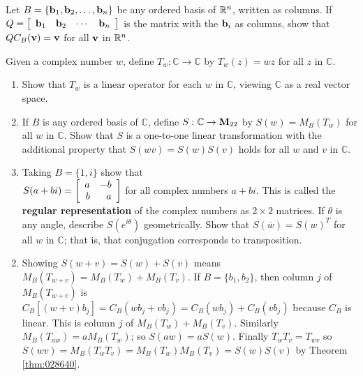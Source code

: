 \begin{multicols}{2}
\begin{ex}
Let $B = \{\textbf{b}_{1}, \textbf{b}_{2}, \dots, \textbf{b}_{n}\}$ be any ordered basis of $\mathbb{R}^n$, written as columns. If $Q = \left[ \begin{array}{cccc} \textbf{b}_{1} & \textbf{b}_{2} & \cdots & \textbf{b}_{n} \end{array} \right]$ is the matrix with the $\textbf{b}_{i}$ as columns, show that $QC_{B}(\textbf{v}) = \textbf{v}$ for all $\textbf{v}$ in $\mathbb{R}^n$.
\end{ex}

\columnbreak
\begin{ex}
Given a complex number $w$, define $T_{w} : \mathbb{C} \to \mathbb{C}$  by $T_{w}(z) = wz$ for all $z$ in $\mathbb{C}$.


\begin{enumerate}[label={\alph*.}]
\item Show that $T_{w}$ is a linear operator for each $w$ in $\mathbb{C}$, viewing $\mathbb{C}$ as a real vector space.

\item If $B$ is any ordered basis of $\mathbb{C}$, define $S : \mathbb{C}  \to \textbf{M}_{22}$ by $S(w) = M_{B}(T_{w})$ for all $w$ in $\mathbb{C}$. Show that $S$ is a one-to-one linear transformation with the additional property that $S(wv) = S(w)S(v)$ holds for all $w$ and $v$ in $\mathbb{C}$.

\item Taking $B = \{1, i\}$ show that \\ $S(a + bi) = \left[ \begin{array}{rr} a & -b \\ b & a \end{array} \right]$ for all complex numbers $a + bi$. This is called the \textbf{regular representation} of the complex numbers as $2 \times 2$ matrices. If $\theta$ is any angle, describe $S(e^{i\theta})$ geometrically. Show that $S(\overline{w}) = S(w)^T$ for all $w$ in $\mathbb{C}$; that is, that conjugation corresponds to transposition.

\end{enumerate}
\begin{sol}
\begin{enumerate}[label={\alph*.}]
\setcounter{enumi}{1}
\item Showing $S(w + v) = S(w) + S(v)$ means $M_{B}(T_{w+v}) = M_{B}(T_{w}) + M_{B}(T_{v})$. If $B = \{b_{1}, b_{2}\}$, then column $j$ of $M_{B}(T_{w+v})$ is $C_{B}[(w + v)b_{j}] = C_{B}(wb_{j} + vb_{j}) = C_{B}(wb_{j}) + C_{B}(vb_{j})$ because $C_{B}$ is linear. This is column $j$ of $M_{B}(T_{w}) + M_{B}(T_{v})$. Similarly $M_{B}(T_{aw}) = aM_{B}(T_{w})$; so $S(aw) = aS(w)$. Finally $T_{w}T_{v} = T_{wv}$ so $S(wv) = M_{B}(T_{w}T_{v}) = M_{B}(T_{w})M_{B}(T_{v}) = S(w)S(v)$ by Theorem \ref{thm:028640}.


\end{enumerate}
\end{sol}
\end{ex}
\end{multicols}
